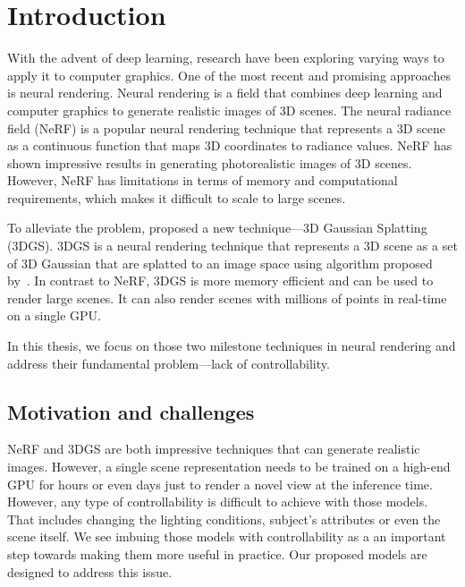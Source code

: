 \chapter{Introduction}
\label{chap:introduction}

                   With the advent of deep learning, research have been
                   exploring varying ways to apply it to computer graphics.
One of the most recent and promising approaches is neural rendering.
Neural rendering is a field that combines deep learning and computer graphics
to generate realistic images of 3D scenes.
The neural radiance field (NeRF) is a popular neural rendering technique that
represents a 3D scene as a continuous function that maps 3D coordinates to
radiance values.
NeRF has shown impressive results in generating photorealistic images of 3D
scenes.
However, NeRF has limitations in terms of memory and computational
requirements, which makes it difficult to scale to large scenes.

                   To alleviate the problem, \textcite{kerbl20233d} proposed a
                   new technique---3D Gaussian Splatting (3DGS).
3DGS is a neural rendering technique that represents a 3D scene as a set of 3D Gaussian that are splatted to an image space using algorithm proposed by~\textcite{zwicker2001ewa}.
 In contrast to NeRF, 3DGS is more memory efficient and can be used to render
 large scenes.
It can also render scenes with millions of points in real-time on a single
GPU.

                   In this thesis, we focus on those two milestone techniques
                   in neural rendering and address their fundamental
                   problem---lack of controllability.

\section{Motivation and challenges}

  NeRF and 3DGS are both impressive techniques that can generate realistic
  images.
  However, a single scene representation needs to be trained on a high-end GPU
  for hours or even days just to render a novel view at the inference time.
  However, any type of controllability is difficult to achieve with those
  models.
  That includes changing the lighting conditions, subject's attributes or even
  the scene itself.
  We see imbuing those models with controllability as a an important step
  towards making them more useful in practice.
  Our proposed models are designed to address this issue.

